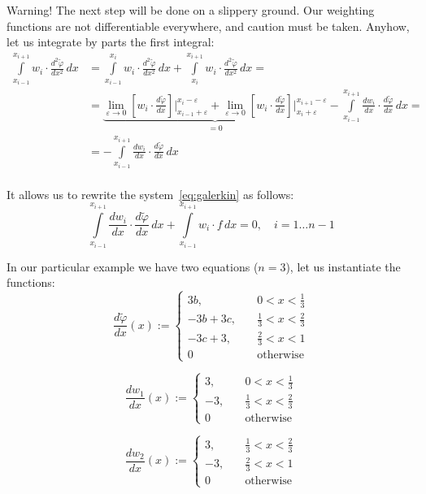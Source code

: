 \documentclass[notitlepage,oneside]{book}
\begin{document}
Warning! The next step will be done on a slippery ground.
Our weighting functions are not differentiable everywhere, and caution must be taken.
Anyhow, let us integrate by parts the first integral:
\begin{align*}
\int\limits_{x_{i-1}}^{x_{i+1}} w_i \cdot \frac{d^2\tilde{\varphi}}{dx^2}\,dx &= 
\int\limits_{x_{i-1}}^{x_{i}} w_i \cdot \frac{d^2\tilde{\varphi}}{dx^2}\,dx + 
\int\limits_{x_{i}}^{x_{i+1}} w_i \cdot \frac{d^2\tilde{\varphi}}{dx^2}\,dx = \\
& =\underbrace{\lim\limits_{\varepsilon\rightarrow 0}\left[w_i\cdot \frac{d\tilde{\varphi}}{dx}\right]\Big|_{x_{i-1}+\varepsilon}^{x_{i}-\varepsilon} +
\lim\limits_{\varepsilon\rightarrow 0}\left[w_i\cdot \frac{d\tilde{\varphi}}{dx}\right]\Big|_{x_{i}+\varepsilon}^{x_{i+1}-\varepsilon}}_{= 0} - \int\limits_{x_{i-1}}^{x_{i+1}} \frac{dw_i}{dx}\cdot \frac{d\tilde{\varphi}}{dx}\,dx  = \\
& = - \int\limits_{x_{i-1}}^{x_{i+1}} \frac{dw_i}{dx}\cdot \frac{d\tilde{\varphi}}{dx}\,dx \\
\end{align*}

It allows us to rewrite the system~\eqref{eq:galerkin} as follows:
\begin{equation}
\label{eq:galerkin:system}
\int\limits_{x_{i-1}}^{x_{i+1}} \frac{dw_i}{dx} \cdot \frac{d\tilde{\varphi}}{dx}\,dx + \int\limits_{x_{i-1}}^{x_{i+1}} w_i\cdot f\,dx = 0, \quad i = 1\dots n-1
\end{equation}

In our particular example we have two equations ($n=3$), let us instantiate the functions:
$$
\frac{d\tilde{\varphi}}{dx} (x) := \left\{
\begin{split}
3b, & \quad 0 < x < \frac{1}{3}\\
-3b+3c, & \quad \frac{1}{3} < x < \frac{2}{3}\\
-3c+3, & \quad \frac{2}{3} < x < 1\\
0 & \quad \text{otherwise}
\end{split}
\right.
$$

$$
\frac{dw_1}{dx} (x) := \left\{
\begin{split}
3, & \quad 0 < x < \frac{1}{3}\\
-3, & \quad \frac{1}{3} < x < \frac{2}{3}\\
0 & \quad \text{otherwise}
\end{split}
\right.
$$

$$
\frac{dw_2}{dx} (x) := \left\{
\begin{split}
3, & \quad \frac{1}{3} < x < \frac{2}{3}\\
-3, & \quad \frac{2}{3} < x < 1\\
0 & \quad \text{otherwise}
\end{split}
\right.
$$
\end{document}
